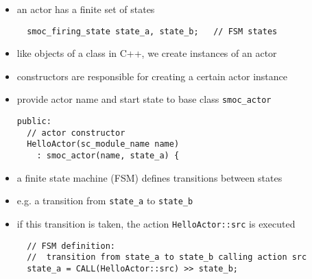 \begin{frame}[fragile=singleslide]
\begin{itemize}
\item an actor has a finite set of states
\begin{lstlisting}
  smoc_firing_state state_a, state_b;   // FSM states
\end{lstlisting}
\item like objects of a class in C++, we create instances of an actor
\item constructors are responsible for creating a certain actor instance
\item provide actor name and start state to base class \lstinline!smoc_actor!
\begin{lstlisting}
public:
  // actor constructor
  HelloActor(sc_module_name name)
    : smoc_actor(name, state_a) {
\end{lstlisting}
\item a finite state machine (FSM) defines transitions between states
\item e.g. a transition from \lstinline!state_a! to \lstinline!state_b!
\item if this transition is taken, the action \lstinline!HelloActor::src! is executed
\begin{lstlisting}
  // FSM definition:
  //  transition from state_a to state_b calling action src
  state_a = CALL(HelloActor::src) >> state_b;
\end{lstlisting}
\end{itemize}
\end{frame}

